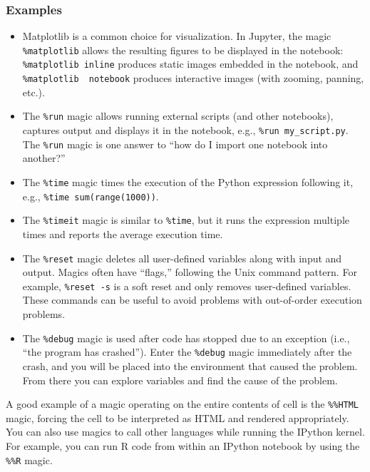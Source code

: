 \documentclass[]{book}
\begin{document}
\subsubsection*{Examples}\label{examples}

\begin{itemize}
\item
  Matplotlib is a common choice for visualization. In Jupyter, the magic
  \texttt{\%matplotlib} allows the resulting figures to be displayed in
  the notebook: \texttt{\%matplotlib\ inline} produces static images
  embedded in the notebook, and \texttt{\%matplotlib\ \ notebook}
  produces interactive images (with zooming, panning, etc.).
\item
  The \texttt{\%run} magic allows running external scripts (and other
  notebooks), captures output and displays it in the notebook, e.g.,
  \texttt{\%run\ my\_script.py}. The \texttt{\%run} magic is one answer
  to ``how do I import one notebook into another?''
\item
  The \texttt{\%time} magic times the execution of the Python expression
  following it, e.g., \texttt{\%time\ sum(range(1000))}.
\item
  The \texttt{\%timeit} magic is similar to \texttt{\%time}, but it runs
  the expression multiple times and reports the average execution time.
\item
  The \texttt{\%reset} magic deletes all user-defined variables along
  with input and output. Magics often have ``flags,'' following the Unix
  command pattern. For example, \texttt{\%reset\ -s} is a soft reset and
  only removes user-defined variables. These commands can be useful to
  avoid problems with out-of-order execution problems.
\item
  The \texttt{\%debug} magic is used after code has stopped due to an
  exception (i.e., ``the program has crashed''). Enter the
  \texttt{\%debug} magic immediately after the crash, and you will be
  placed into the environment that caused the problem. From there you
  can explore variables and find the cause of the problem.
\end{itemize}

A good example of a magic operating on the entire contents of cell is
the \texttt{\%\%HTML} magic, forcing the cell to be interpreted as HTML
and rendered appropriately. You can also use magics to call other
languages while running the IPython kernel. For example, you can run R
code from within an IPython notebook by using the \texttt{\%\%R} magic.
\end{document}
